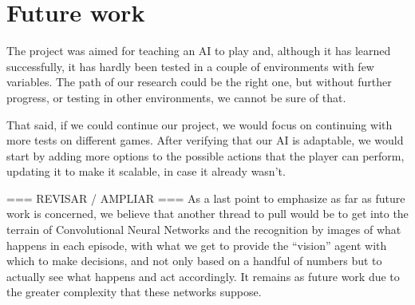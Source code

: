 \section{Future work}

The project was aimed for teaching an AI to play and, although it has learned successfully, it has hardly been tested in a couple of environments with few variables. The path of our research could be the right one, but without further progress, or testing in other environments, we cannot be sure of that.

That said, if we could continue our project, we would focus on continuing with more tests on different games. After verifying that our AI is adaptable, we would start by adding more options to the possible actions that the player can perform, updating it to make it scalable, in case it already wasn't.

=== REVISAR / AMPLIAR ===
As a last point to emphasize as far as future work is concerned, we believe that another thread to pull would be to get into the terrain of Convolutional Neural Networks and the recognition by images of what happens in each episode, with what we get to provide the ``vision'' agent with which to make decisions, and not only based on a handful of numbers but to actually see what happens and act accordingly. It remains as future work due to the greater complexity that these networks suppose.

